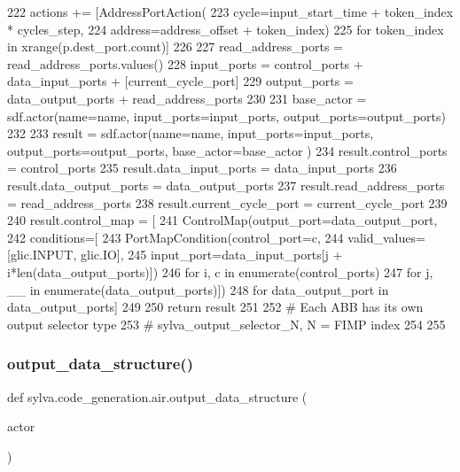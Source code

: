 \begin{DoxyCode}
222                 actions += [AddressPortAction(
223                     cycle=input\_start\_time + token\_index * cycles\_step,
224                     address=address\_offset + token\_index)
225                     \textcolor{keywordflow}{for} token\_index \textcolor{keywordflow}{in} xrange(p.dest\_port.count)]
226 
227     read\_address\_ports = read\_address\_ports.values()
228     input\_ports = control\_ports + data\_input\_ports + [current\_cycle\_port]
229     output\_ports = data\_output\_ports + read\_address\_ports
230 
231     base\_actor = sdf.actor(name=name, input\_ports=input\_ports, output\_ports=output\_ports)
232 
233     result = sdf.actor(name=name, input\_ports=input\_ports, output\_ports=output\_ports, base\_actor=base\_actor
      )
234     result.control\_ports = control\_ports
235     result.data\_input\_ports = data\_input\_ports
236     result.data\_output\_ports = data\_output\_ports
237     result.read\_address\_ports = read\_address\_ports
238     result.current\_cycle\_port = current\_cycle\_port
239 
240     result.control\_map = [
241         ControlMap(output\_port=data\_output\_port,
242                    conditions=[
243                        PortMapCondition(control\_port=c,
244                                         valid\_values=[glic.INPUT, glic.IO],
245                                         input\_port=data\_input\_ports[j + i*len(data\_output\_ports)])
246                        \textcolor{keywordflow}{for} i, c \textcolor{keywordflow}{in} enumerate(control\_ports)
247                        \textcolor{keywordflow}{for} j, \_\_ \textcolor{keywordflow}{in} enumerate(data\_output\_ports)])
248         \textcolor{keywordflow}{for} data\_output\_port \textcolor{keywordflow}{in} data\_output\_ports]
249 
250     \textcolor{keywordflow}{return} result
251 
252 \textcolor{comment}{# Each ABB has its own output selector type}
253 \textcolor{comment}{# sylva\_output\_selector\_N, N = FIMP index}
254 
255 
\end{DoxyCode}
\mbox{\label{namespacesylva_1_1code__generation_1_1air_a83186b3b999778cee36ac81d42b2cd44}} 
\subsubsection{\texorpdfstring{output\+\_\+data\+\_\+structure()}{output\_data\_structure()}}
{\footnotesize\ttfamily def sylva.\+code\+\_\+generation.\+air.\+output\+\_\+data\+\_\+structure (\begin{DoxyParamCaption}\item[{}]{actor }\end{DoxyParamCaption})}



